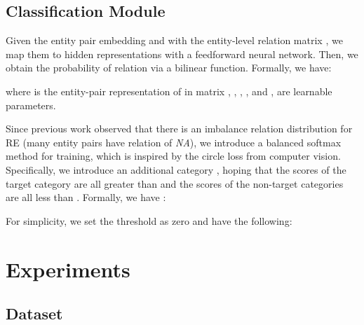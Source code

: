 \documentclass{article}
\begin{document}
\subsection{Classification Module}
Given the entity pair embedding  and  with the entity-level relation matrix , we map them to hidden representations  with a feedforward neural network. Then, we obtain the probability of relation via a bilinear function. Formally, we have: 

   


where  is the entity-pair representation of  in matrix ,
, , , and , are learnable parameters.
  
Since previous work \cite{Wang2019FinetuneBF} observed that there is an imbalance relation distribution for RE (many entity pairs have relation of \emph{NA}), we introduce a balanced softmax method for training, which is inspired by the circle loss \cite{sun2020circle} from computer vision. Specifically, we introduce an additional category , hoping that the scores of the target category are all greater than  and the scores of the non-target categories are all less than . Formally, we have \cite{jianlinsu}:


For simplicity, we set the threshold as zero and have the following: 




\section{Experiments}

\subsection{Dataset}
\begin{table}[!t]
\centering
{}
    \caption{Statistics of the experimental datasets.}
    \label{tab::statistics}
\end{table}
\end{document}
